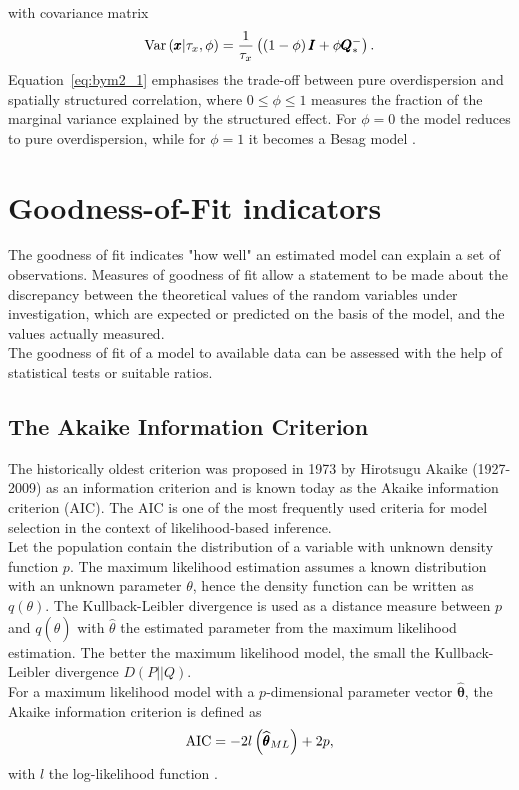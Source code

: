 with covariance matrix
\begin{equation}
    \hbox{Var}\left(\pmb{x}|\tau_x,\phi\right)=\frac{1}{\tau_x}\left(\left(1-\phi\right)\pmb{I}+\phi\pmb{Q}_{*}^{-}\right).
\end{equation}
Equation~\ref{eq:bym2_1} emphasises the trade-off between pure overdispersion and spatially structured correlation, where $0\leq\phi\leq1$ measures the fraction of the marginal variance explained by the structured effect. For $\phi=0$ the model reduces to pure overdispersion, while for $\phi=1$ it becomes a Besag model \autocite[][]{martins2014penalising, riebler2016intuitive}.
\clearpage
\section{Goodness-of-Fit indicators}\label{sec:performance}
The goodness of fit indicates "how well" an estimated model can explain a set of observations. Measures of goodness of fit allow a statement to be made about the discrepancy between the theoretical values of the random variables under investigation, which are expected or predicted on the basis of the model, and the values actually measured. \\
The goodness of fit of a model to available data can be assessed with the help of statistical tests or suitable ratios.
\subsection{The Akaike Information Criterion}
The historically oldest criterion was proposed in 1973 by Hirotsugu Akaike (1927-2009) as an information criterion and is known today as the Akaike information criterion (AIC). The AIC is one of the most frequently used criteria for model selection in the context of likelihood-based inference.  \\
Let the population contain the distribution of a variable with unknown density function $p$. The maximum likelihood estimation assumes a known distribution with an unknown parameter $\theta$, hence the density function can be written as $q\left(\theta\right)$. The Kullback-Leibler divergence is used as a distance measure between $p$ and $q\left(\widehat{\theta}\right)$ with $\widehat{\theta}$ the estimated parameter from the maximum likelihood estimation. The better the maximum likelihood model, the small the Kullback-Leibler divergence $D\left(P||Q\right)$. \\
For a maximum likelihood model with a $p$-dimensional parameter vector $\widehat{\pmb{\theta}}$, the Akaike information criterion is defined as
\begin{equation}
    \hbox{AIC}=-2l\left(\widehat{\pmb{\theta}}_{ML}\right)+2p,
\end{equation}
with $l$ the log-likelihood function \autocite[][]{akaike1974new}.

